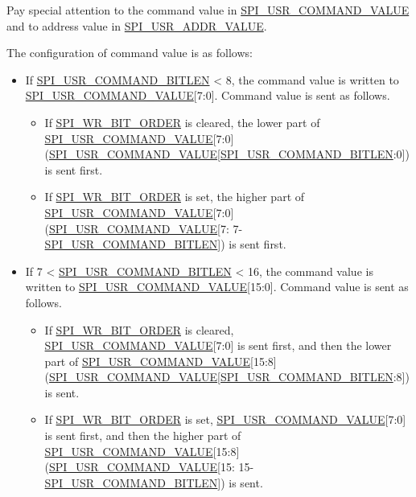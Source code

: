 \documentclass[main\_\_EN.tex]{subfiles}
\begin{document}
Pay special attention to the command value in \hyperref[fielddesc:SPIUSRCOMMANDVALUE]{SPI\_USR\_COMMAND\_VALUE} and to address value in \hyperref[fielddesc:SPIUSRADDRVALUE]{SPI\_USR\_ADDR\_VALUE}.

The configuration of command value is as follows:

\begin{itemize}

\item If \hyperref[fielddesc:SPIUSRCOMMANDBITLEN]{SPI\_USR\_COMMAND\_BITLEN} < 8, the command value is written to \hyperref[fielddesc:SPIUSRCOMMANDVALUE]{SPI\_USR\_COMMAND\_VALUE}[7:0]. Command value is sent as follows.
\begin{itemize}
    \item If \hyperref[fielddesc:SPIWRBITORDER]{SPI\_WR\_BIT\_ORDER} is cleared, the lower part of \hyperref[fielddesc:SPIUSRCOMMANDVALUE]{SPI\_USR\_COMMAND\_VALUE}[7:0] (\hyperref[fielddesc:SPIUSRCOMMANDVALUE]{SPI\_USR\_COMMAND\_VALUE}[\hyperref[fielddesc:SPIUSRCOMMANDBITLEN]{SPI\_USR\_COMMAND\_BITLEN}:0]) is sent first.
    \item If \hyperref[fielddesc:SPIWRBITORDER]{SPI\_WR\_BIT\_ORDER} is set, the higher part of \hyperref[fielddesc:SPIUSRCOMMANDVALUE]{SPI\_USR\_COMMAND\_VALUE}[7:0] (\hyperref[fielddesc:SPIUSRCOMMANDVALUE]{SPI\_USR\_COMMAND\_VALUE}[7: 7-\hyperref[fielddesc:SPIUSRCOMMANDBITLEN]{SPI\_USR\_COMMAND\_BITLEN}]) is sent first.
\end{itemize}

\item If 7 < \hyperref[fielddesc:SPIUSRCOMMANDBITLEN]{SPI\_USR\_COMMAND\_BITLEN} < 16, the command value is written to \hyperref[fielddesc:SPIUSRCOMMANDVALUE]{SPI\_USR\_COMMAND\_VALUE}[15:0]. Command value is sent as follows.
\begin{itemize}
    \item If \hyperref[fielddesc:SPIWRBITORDER]{SPI\_WR\_BIT\_ORDER} is cleared, \hyperref[fielddesc:SPIUSRCOMMANDVALUE]{SPI\_USR\_COMMAND\_VALUE}[7:0] is sent first, and then the lower part of  \hyperref[fielddesc:SPIUSRCOMMANDVALUE]{SPI\_USR\_COMMAND\_VALUE}[15:8] (\hyperref[fielddesc:SPIUSRCOMMANDVALUE]{SPI\_USR\_COMMAND\_VALUE}[\hyperref[fielddesc:SPIUSRCOMMANDBITLEN]{SPI\_USR\_COMMAND\_BITLEN}:8]) is sent.
    \item If \hyperref[fielddesc:SPIWRBITORDER]{SPI\_WR\_BIT\_ORDER} is set, \hyperref[fielddesc:SPIUSRCOMMANDVALUE]{SPI\_USR\_COMMAND\_VALUE}[7:0] is sent first, and then the higher part of  \hyperref[fielddesc:SPIUSRCOMMANDVALUE]{SPI\_USR\_COMMAND\_VALUE}[15:8] (\hyperref[fielddesc:SPIUSRCOMMANDVALUE]{SPI\_USR\_COMMAND\_VALUE}[15: 15-\hyperref[fielddesc:SPIUSRCOMMANDBITLEN]{SPI\_USR\_COMMAND\_BITLEN}]) is sent.
\end{itemize}
\end{itemize}
\end{document}
